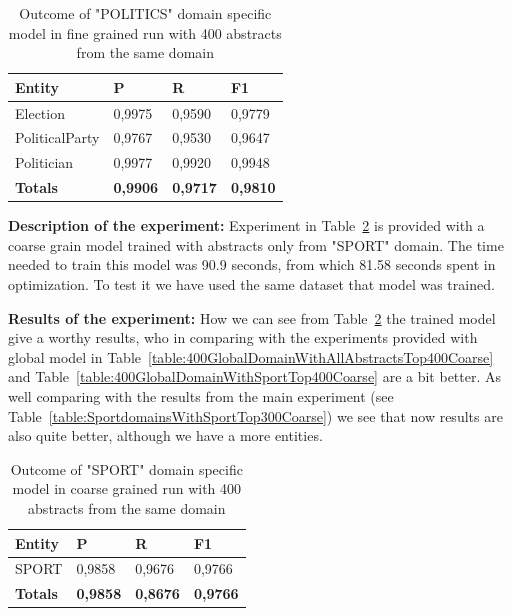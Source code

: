 \documentclass[thesis=M,english]{FITthesis}[2018/05/30]
\begin{document}
	\begin{table}[H]\centering
		\begin{tabular}{|l|l|l|l|}
			\hline {\textbf{Entity}} & {\textbf{P}} & {\textbf{R}} & {\textbf{F1}}\\\hline
				Election & 0,9975 & 0,9590 & 0,9779\\
				PoliticalParty & 0,9767 & 0,9530 & 0,9647\\
				Politician & 0,9977 & 0,9920 & 0,9948\\\hline
				\textbf{Totals} & \textbf{0,9906} & \textbf{0,9717} & \textbf{0,9810}\\\hline
		\end{tabular}
		\caption{Outcome of "POLITICS" domain specific model in fine grained run with 400 abstracts from the same domain \label{table:400PoliticsDomainWithPoliticsTop400Fine}}
	\end{table}	
	

\textbf{Description of the experiment:} Experiment in Table~\ref{table:400SportDomainWithSportTop400Coarse} is provided with a coarse grain model trained with abstracts only from "SPORT" domain. The time needed to train this model was 90.9 seconds, from which 81.58 seconds spent in optimization. To test it we have used the same dataset that model was trained.  

\textbf{Results of the experiment:} How we can see from Table~\ref{table:400SportDomainWithSportTop400Coarse} the trained model give a worthy results, who in comparing with the experiments provided with global model in Table~\ref{table:400GlobalDomainWithAllAbstractsTop400Coarse} and Table~\ref{table:400GlobalDomainWithSportTop400Coarse} are a bit better. As well comparing with the results from the main experiment (see Table~\ref{table:SportdomainsWithSportTop300Coarse}) we see that now results are also quite better, although we have a more entities.   

	\begin{table}[H]\centering
		\begin{tabular}{|l|l|l|l|}
			\hline {\textbf{Entity}} & {\textbf{P}} & {\textbf{R}} & {\textbf{F1}}\\\hline
				SPORT & 0,9858 & 0,9676 & 0,9766\\\hline
				\textbf{Totals} & \textbf{0,9858} & \textbf{0,8676} & \textbf{0,9766}\\\hline
		\end{tabular}
		\caption{Outcome of "SPORT" domain specific model in coarse grained run with 400 abstracts from the same domain \label{table:400SportDomainWithSportTop400Coarse}}
	\end{table}
\end{document}
